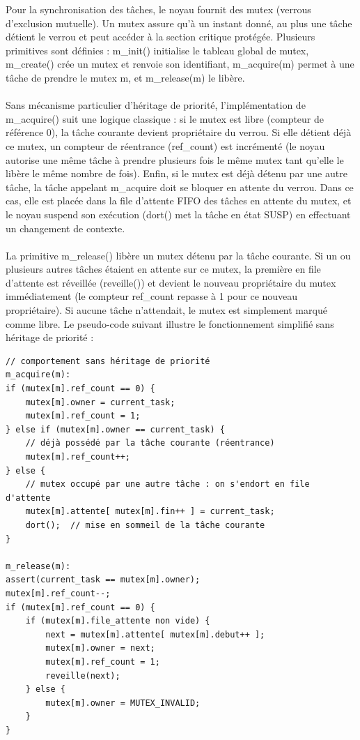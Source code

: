 \documentclass{latexPackage/utc-report/utc-report}
\begin{document}
Pour la synchronisation des tâches, le noyau fournit des mutex (verrous d’exclusion mutuelle). Un mutex assure qu’à un instant donné, au plus une tâche détient le verrou et peut accéder à la section critique protégée. Plusieurs primitives sont définies : m\_init() initialise le tableau global de mutex, m\_create() crée un mutex et renvoie son identifiant, m\_acquire(m) permet à une tâche de prendre le mutex m, et m\_release(m) le libère.
\\\\
Sans mécanisme particulier d’héritage de priorité, l’implémentation de m\_acquire() suit une logique classique : si le mutex est libre (compteur de référence 0), la tâche courante devient propriétaire du verrou. Si elle détient déjà ce mutex, un compteur de réentrance (ref\_count) est incrémenté (le noyau autorise une même tâche à prendre plusieurs fois le même mutex tant qu’elle le libère le même nombre de fois). Enfin, si le mutex est déjà détenu par une autre tâche, la tâche appelant m\_acquire doit se bloquer en attente du verrou. Dans ce cas, elle est placée dans la file d’attente FIFO des tâches en attente du mutex, et le noyau suspend son exécution (dort() met la tâche en état SUSP) en effectuant un changement de contexte.
\\\\
La primitive m\_release() libère un mutex détenu par la tâche courante. Si un ou plusieurs autres tâches étaient en attente sur ce mutex, la première en file d’attente est réveillée (reveille()) et devient le nouveau propriétaire du mutex immédiatement (le compteur ref\_count repasse à 1 pour ce nouveau propriétaire). Si aucune tâche n’attendait, le mutex est simplement marqué comme libre. Le pseudo-code suivant illustre le fonctionnement simplifié sans héritage de priorité :

\begin{verbatim}
// comportement sans héritage de priorité
m_acquire(m):
if (mutex[m].ref_count == 0) {
    mutex[m].owner = current_task;
    mutex[m].ref_count = 1;
} else if (mutex[m].owner == current_task) {
    // déjà possédé par la tâche courante (réentrance)
    mutex[m].ref_count++;
} else {
    // mutex occupé par une autre tâche : on s'endort en file d'attente
    mutex[m].attente[ mutex[m].fin++ ] = current_task;
    dort();  // mise en sommeil de la tâche courante
}

m_release(m):
assert(current_task == mutex[m].owner);
mutex[m].ref_count--;
if (mutex[m].ref_count == 0) {
    if (mutex[m].file_attente non vide) {
        next = mutex[m].attente[ mutex[m].debut++ ];
        mutex[m].owner = next;
        mutex[m].ref_count = 1;
        reveille(next);
    } else {
        mutex[m].owner = MUTEX_INVALID;
    }
}
\end{verbatim}
\end{document}
